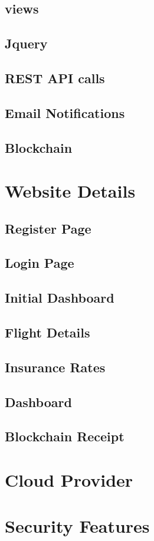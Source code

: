 \subsection{views}
\subsection{Jquery}
\subsection{REST API calls}
\subsection{Email Notifications}
\subsection{Blockchain}

\section{Website Details}
\subsection{Register Page}
\subsection{Login Page}
\subsection{Initial Dashboard}
\subsection{Flight Details}
\subsection{Insurance Rates}
\subsection{Dashboard}
\subsection{Blockchain Receipt}

\section{Cloud Provider}

\section{Security Features}